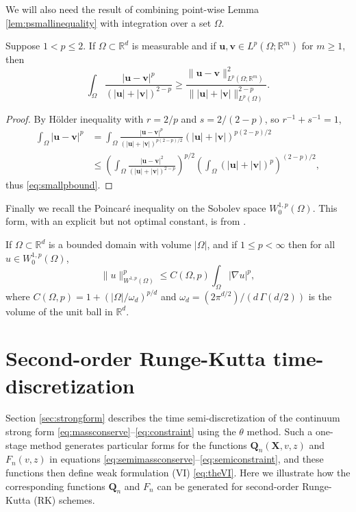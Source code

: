 \documentclass[final,onefignum]{siamart190516}
\newcommand\bu{\mathbf{u}}
\newcommand\bv{\mathbf{v}}
\newcommand\bQ{\mathbf{Q}}
\newcommand\bX{\mathbf{X}}
\newcommand{\grad}{\nabla}
\newcommand\RR{\mathbb{R}}
\begin{document}
We will also need the result of combining point-wise Lemma \ref{lem:psmallinequality} with integration over a set $\Omega$.

\begin{lemma} \label{lem:smallpbound}  Suppose $1<p\le 2$.  If $\Omega \subset \RR^d$ is measurable and if $\bu,\bv\in L^p(\Omega; \RR^m)$ for $m\ge 1$, then
\begin{equation}
    \int_\Omega \frac{|\bu-\bv|^p}{\left(|\bu|+|\bv|\right)^{2-p}} \ge \frac{\|\bu-\bv\|_{L^p(\Omega; \RR^m)}^2}{\big\||\bu|+|\bv|\big\|_{L^p(\Omega)}^{2-p}}. \label{eq:smallpbound}
\end{equation}
\end{lemma}

\begin{proof}  By H\"older inequality with $r=2/p$ and $s=2/(2-p)$, so $r^{-1}+s^{-1}=1$,
\begin{align*}
\int_\Omega |\bu - \bv|^p &= \int_\Omega \frac{|\bu-\bv|^p}{\left(|\bu|+|\bv|\right)^{p(2-p)/2}} \left(|\bu|+|\bv|\right)^{p(2-p)/2} \\
    &\le \left(\int_\Omega \frac{|\bu-\bv|^2}{\left(|\bu|+|\bv|\right)^{2-p}}\right)^{p/2} \left(\int_\Omega \left(|\bu|+|\bv|\right)^p\right)^{(2-p)/2},
\end{align*}
thus \eqref{eq:smallpbound}.
\end{proof}

Finally we recall the Poincar\'e inequality on the Sobolev space $W_0^{1,p}(\Omega)$.  This form, with an explicit but not optimal constant, is from \cite[section 7.8]{GilbargTrudinger2001}.

\begin{lemma} \label{lem:poincare}  If $\Omega\subset \RR^d$ is a bounded domain with volume $|\Omega|$, and if $1\le p<\infty$ then for all $u\in W_0^{1,p}(\Omega)$,
\begin{equation}
  \|u\|_{W^{1,p}(\Omega)}^p \le C(\Omega,p) \int_\Omega |\grad u|^p, \label{eq:poincare}
\end{equation}
where $C(\Omega,p)=1+(|\Omega|/\omega_d)^{p/d}$ and $\omega_d=(2 \pi^{d/2})/(d\,\Gamma(d/2))$ is the volume of the unit ball in $\RR^d$.
\end{lemma}


\section{Second-order Runge-Kutta time-discretization}  \label{app:rk2}  Section \ref{sec:strongform} describes the time semi-discretization of the continuum strong form \eqref{eq:massconserve}--\eqref{eq:constraint} using the $\theta$ method.  Such a one-stage method generates particular forms for the functions $\bQ_n(\bX,v,z)$ and $F_n(v,z)$ in equations \eqref{eq:semimassconserve}--\eqref{eq:semiconstraint}, and these functions then define weak formulation (VI) \eqref{eq:theVI}.  Here we illustrate how the corresponding functions $\bQ_n$ and $F_n$ can be generated for second-order Runge-Kutta (RK) schemes.
\end{document}

